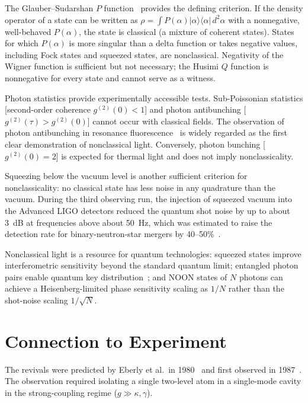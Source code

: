 \documentclass[%
 reprint,
 amsmath,amssymb,
 aps,
 floatfix,
]{revtex4-2}
\begin{document}
The Glauber--Sudarshan $P$ function~\cite{glauber1963, sudarshan1963} provides the defining criterion. If the density operator of a state can be written as $\rho = \int P(\alpha) |\alpha\rangle\langle\alpha|\,d^2\alpha$ with a nonnegative, well-behaved $P(\alpha)$, the state is classical (a mixture of coherent states). States for which $P(\alpha)$ is more singular than a delta function or takes negative values, including Fock states and squeezed states, are nonclassical. Negativity of the Wigner function is sufficient but not necessary; the Husimi $Q$ function is nonnegative for every state and cannot serve as a witness.

Photon statistics provide experimentally accessible tests. Sub-Poissonian statistics [second-order coherence $g^{(2)}(0) < 1$] and photon antibunching [$g^{(2)}(\tau) > g^{(2)}(0)$] cannot occur with classical fields. The observation of photon antibunching in resonance fluorescence~\cite{kimble1977} is widely regarded as the first clear demonstration of nonclassical light. Conversely, photon bunching [$g^{(2)}(0) = 2$] is expected for thermal light and does not imply nonclassicality.

Squeezing below the vacuum level is another sufficient criterion for nonclassicality: no classical state has less noise in any quadrature than the vacuum. During the third observing run, the injection of squeezed vacuum into the Advanced LIGO detectors reduced the quantum shot noise by up to about 3~dB at frequencies above about 50~Hz, which was estimated to raise the detection rate for binary-neutron-star mergers by 40--50\%~\cite{tse2019}.

Nonclassical light is a resource for quantum technologies: squeezed states improve interferometric sensitivity beyond the standard quantum limit; entangled photon pairs enable quantum key distribution~\cite{ekert1991}; and NOON states of $N$ photons can achieve a Heisenberg-limited phase sensitivity scaling as $1/N$ rather than the shot-noise scaling $1/\sqrt{N}$.


\section{Connection to Experiment}
\label{sec:experiment}

The revivals were predicted by Eberly et al.\ in 1980~\cite{eberly1980} and first observed in 1987~\cite{rempe1987}. The observation required isolating a single two-level atom in a single-mode cavity in the strong-coupling regime ($g \gg \kappa, \gamma$).
\end{document}
